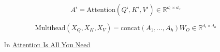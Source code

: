 \documentclass[11pt]{article}
\theoremstyle{definition}
\begin{document}
\begin{equation}
A^i = \mathrm{Attention} \left(Q^i,K^i,V^i \right) \in \mathbb{R}^{d_l \times d_v}
\end{equation}

\begin{equation}
\mathrm{Multihead}\left(X_Q, X_K, X_V \right) =
\mathrm{concat} \left( A_1, ... , A_h \right)W_O
\in \mathbb{R}^{d_l \times d_o}
\end{equation}

In \href{https://arxiv.org/pdf/1706.03762.pdf}{Attention Is All You Need}
\end{document}
